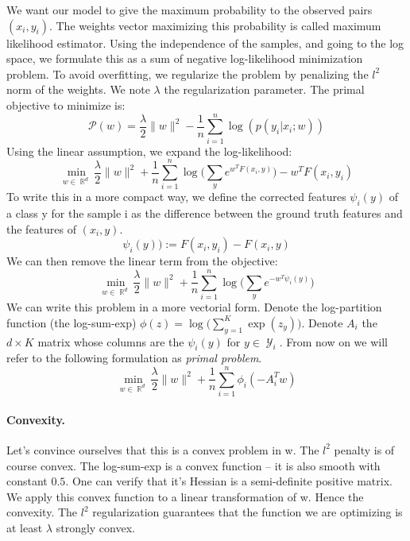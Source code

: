 \documentclass{article}
\DeclareMathOperator{\R}{\mathbb{R}}
\DeclareMathOperator{\1}{\mathbb{1}}
\DeclareMathOperator{\Y}{\mathcal{Y}}
\begin{document}
We want our model to give the maximum probability to the observed pairs $(x_i, y_i)$.
The weights vector maximizing this probability is called maximum likelihood estimator.
Using the independence of the samples, and going to the log space, we formulate this as a sum of negative log-likelihood minimization problem.
To avoid overfitting, we regularize the problem by penalizing the $l^2$ norm of the weights.
We note $\lambda$ the regularization parameter. The primal objective to minimize is:
\begin{equation*}
\mathscr P(w) = \frac{\lambda}{2}\|w\|^2 - \frac{1}{n}   \sum_{i=1}^{n} \log(p(y_i|x_i; w))	
\end{equation*}
Using the linear assumption, we expand the log-likelihood:
\begin{equation*}
	\min_{w\in\R^d} \frac{\lambda}{2}\|w\|^2 + \frac{1}{n}   \sum_{i=1}^{n}  \log \big (\sum_y e^{w^TF(x_i, y)} \big ) - w^TF(x_i, y_i)	
\end{equation*}
To write this in a more compact way, we define the corrected features $\psi_i(y)$ of a class y for the sample i as the difference between the ground truth features and the features of $(x_i, y)$.
\begin{equation*}
	\psi_i(y)) := F(x_i, y_i) - F(x_i, y)
\end{equation*}
We can then remove the linear term from the objective:
\begin{equation*}
	\min_{w\in\R^d} \frac{\lambda}{2}\|w\|^2 + \frac{1}{n}   \sum_{i=1}^{n}  \log \big (\sum_y e^{- w^T\psi_i(y)} \big )
\end{equation*}
We can write this problem in a more vectorial form.
Denote the log-partition function (the log-sum-exp) $\phi(z) = \log \big(\sum_{y=1}^K \exp(z_y)\big)$. 
Denote $A_i$ the $d \times K$ matrix whose columns are the $\psi_i(y)$ for $y \in \Y_i$.
From now on we will refer to the following formulation as \textit{primal problem}.
\begin{equation}
	\label{primal problem}
	\min_{w\in\R^d}  \frac{\lambda}{2}\|w\|^2 + \frac{1}{n}   \sum_{i=1}^{n} \phi_i(-A_i^Tw)
\end{equation} 

\paragraph{Convexity.}
Let's convince ourselves that this is a convex problem in w.
The $l^2$ penalty is of course convex.
The log-sum-exp is a convex function -- it is also smooth with constant $0.5$.
One can verify that it's Hessian is a semi-definite positive matrix.
We apply this convex function to a linear transformation of w.
Hence the convexity.
The $l^2$ regularization guarantees that the function we are optimizing is at least $\lambda$ strongly convex. 
\end{document}
